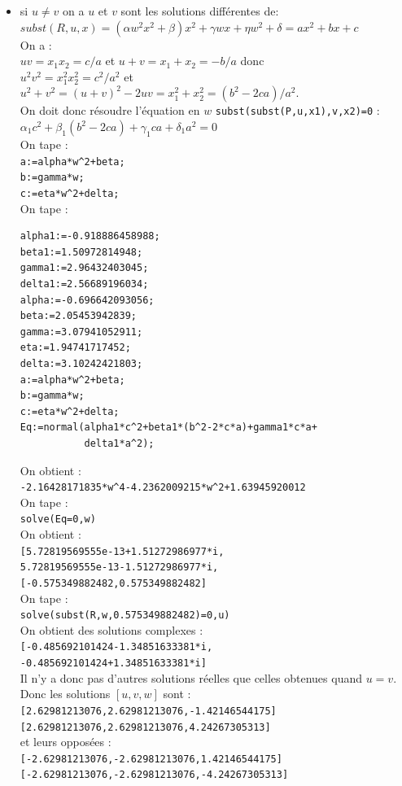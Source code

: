 \documentclass[a4paper,11pt]{book}
\begin{document}
\begin{itemize}
\item si $u \neq v$  on a $u$ et $v$ sont les solutions diff\'erentes de:\\
$subst(R,u,x)=(\alpha w^2x^2+\beta)x^2+\gamma wx+\eta w^2+\delta=ax^2+bx+c$\\
On a :\\
$uv=x_1x_2=c/a$ et $u+v=x_1+x_2=-b/a$ donc\\
$u^2v^2=x_1^2x_2^2=c^2/a^2$ et\\
 $u^2+v^2=(u+v)^2-2uv=x_1^2+x_2^2=(b^2-2ca)/a^2$.\\
On doit donc r\'esoudre l'\'equation en $w$ {\tt subst(subst(P,u,x1),v,x2)=0} :\\
$\alpha_1 c^2+\beta_1 (b^2-2ca)+\gamma_1 ca +\delta_1 a^2=0$\\
On tape :\\
{\tt a:=alpha*w\verb|^|2+beta;}\\
{\tt b:=gamma*w;}\\
{\tt c:=eta*w\verb|^|2+delta;}\\
On tape :
\begin{verbatim}
alpha1:=-0.918886458988;
beta1:=1.50972814948;
gamma1:=2.96432403045;
delta1:=2.56689196034;
alpha:=-0.696642093056;
beta:=2.05453942839;
gamma:=3.07941052911;
eta:=1.94741717452;
delta:=3.10242421803;
a:=alpha*w^2+beta;
b:=gamma*w;
c:=eta*w^2+delta;
Eq:=normal(alpha1*c^2+beta1*(b^2-2*c*a)+gamma1*c*a+
           delta1*a^2);
\end{verbatim}
On obtient :\\
{\tt -2.16428171835*w\verb|^|4-4.2362009215*w\verb|^|2+1.63945920012}\\
On tape :\\
{\tt solve(Eq=0,w)}\\
On obtient :\\
{\tt [5.72819569555e-13+1.51272986977*i,}\\
{\tt 5.72819569555e-13-1.51272986977*i,}\\
{\tt [-0.575349882482,0.575349882482]}\\
On tape :\\
{\tt solve(subst(R,w,0.575349882482)=0,u)}\\
On obtient des solutions complexes :\\
{\tt [-0.485692101424-1.34851633381*i,}\\
{\tt -0.485692101424+1.34851633381*i]}\\
Il n'y a donc pas d'autres solutions r\'eelles que celles obtenues quand $u=v$.
Donc les solutions $[u,v,w]$ sont :\\
{\tt [2.62981213076,2.62981213076,-1.42146544175]}\\
{\tt [2.62981213076,2.62981213076,4.24267305313]}\\
et leurs oppos\'ees :\\
{\tt [-2.62981213076,-2.62981213076,1.42146544175]}\\
{\tt [-2.62981213076,-2.62981213076,-4.24267305313]}\\
\end{itemize}
\end{document}
